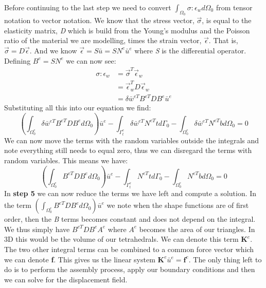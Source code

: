 Before continuing to the last step we need to convert $\int_{\Omega_0}  \sigma :\epsilon_wd\Omega_0$ from tensor notation to vector notation. We know that the stress vector, $\overrightarrow{\sigma}$, is equal to the elasticity matrix, \textit{D} which is build from the Young's modulus and the Poisson ratio of the material we are modelling, times the strain vector, $\overrightarrow{\epsilon}$. That is, $\overrightarrow{\sigma} = D\overrightarrow{\epsilon}$. And we know $\overrightarrow{\epsilon} = S\bar{u} = SN^e\bar{u}^e$ where \textit{S} is the differential operator. Defining $B^e = SN^e$ we can now see:
\begin{align*}
	\sigma : \epsilon_w &= \overrightarrow{\sigma}^T\overrightarrow{\epsilon}_w\\
	&= \overrightarrow{\epsilon}_w^T D \overrightarrow{\epsilon}_w\\
	&= \delta \bar{w}^{eT}B^{eT}DB^e\bar{u}^e
\end{align*}
Substituting all this into our equation we find:
\begin{equation*}
	\left(\int_{\Omega_0^e} \delta \bar{w}^{eT}B^{eT}DB^e d\Omega_0\right) \bar{u}^e - \int_{\Gamma_t^e}\delta \bar{w}^{eT}N^{eT}td\Gamma_0 - \int_{\Omega_0^e} \delta \bar{w}^{eT}N^{eT}bd\Omega_0 = 0
\end{equation*}
We can now move the terms with the random variables outside the integrals and note everything still needs to equal zero, thus we can disregard the terms with random variables. This means we have:
\begin{equation*}
	\left(\int_{\Omega_0^e} B^{eT}DB^e d\Omega_0\right) \bar{u}^e - \int_{\Gamma_t^e}N^{eT}td\Gamma_0 - \int_{\Omega_0^e} N^{eT}bd\Omega_0 = 0
\end{equation*}
In \textbf{step 5} we can now reduce the terms we have left and compute a solution. In the term $\left(\int_{\Omega_0^e} B^{eT}DB^e d\Omega_0\right) \bar{u}^e$ we note when the shape functions are of first order, then the \textit{B} terms becomes constant and does not depend on the integral. We thus simply have $B^{eT}DB^eA^e$ where $A^e$ becomes the area of our triangles. In 3D this would be the volume of our tetrahedrals. We can denote this term $\mathbf{K}^e$. The two other integral terms can be combined to a common force vector which we can denote \textbf{f}. This gives us the linear system $\mathbf{K}^e\bar{u}^e = \mathbf{f}^e$. The only thing left to do is to perform the assembly process, apply our boundary conditions and then we can solve for the displacement field.